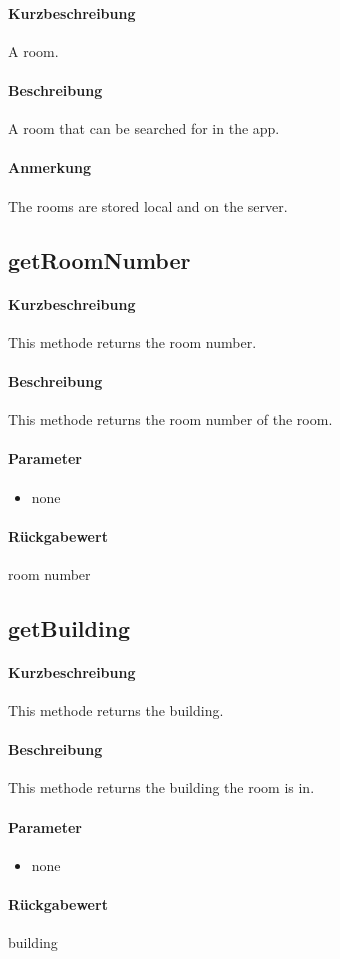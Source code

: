 \paragraph*{Kurzbeschreibung}
A room.
\paragraph*{Beschreibung}
A room that can be searched for in the app.
\paragraph*{Anmerkung}
The rooms are stored local and on the server.

\subsection{getRoomNumber}%
\paragraph*{Kurzbeschreibung}
This methode returns the room number.
\paragraph*{Beschreibung}
This methode returns the room number of the room.
\paragraph*{Parameter}
\begin{itemize}
    \item none
\end{itemize}
\paragraph*{Rückgabewert}
room number

\subsection{getBuilding}%
\paragraph*{Kurzbeschreibung}
This methode returns the building.
\paragraph*{Beschreibung}
This methode returns the building the room is in.
\paragraph*{Parameter}
\begin{itemize}
    \item none
\end{itemize}
\paragraph*{Rückgabewert}
building